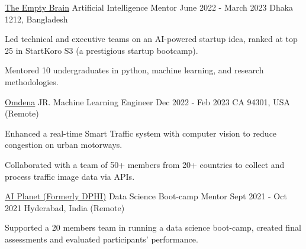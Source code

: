 


\begin{cventries}
  \cventry
    {\href{https://empty-brain.github.io/}{The Empty Brain}} %
    {Artificial Intelligence Mentor} %
    {June 2022 - March 2023} %
    {Dhaka 1212, Bangladesh} %
    {
      \begin{cvitems} %
        \item{Led technical and executive teams on an AI-powered startup idea, ranked at top 25 in StartKoro S3 (a prestigious startup bootcamp).}
        \item{Mentored 10 undergraduates in python, machine learning, and research methodologies.}
      \end{cvitems}
    }    

  \cventry
    {\href{https://omdena.com/}{Omdena}} %
    {JR. Machine Learning Engineer} %
    {Dec 2022 - Feb 2023} %
    {CA 94301, USA (Remote)} %
    {
      \begin{cvitems} %
        \item {Enhanced a real-time Smart Traffic system with computer vision to reduce congestion on urban motorways.}
        \item {Collaborated with a team of 50+ members from 20+ countries to collect and process traffic image data via APIs.}
      \end{cvitems}
    }



  \cventry
    {\href{https://aiplanet.com/}{AI Planet (Formerly DPHI)}} %
    {Data Science Boot-camp Mentor} %
    {Sept 2021 - Oct 2021} %
    {Hyderabad, India (Remote)} %
    {
      \begin{cvitems} %
        \item {Supported a 20 members team in running a data science boot-camp, created final assessments and evaluated participants' performance.}
      \end{cvitems}
    }


\end{cventries}
